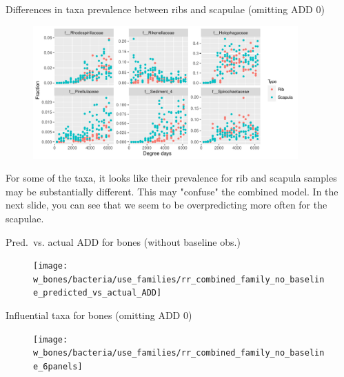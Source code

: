 \documentclass{beamer}
\begin{document}
\begin{frame}{Differences in taxa prevalence between ribs and scapulae (omitting ADD 0)}

  \begin{center}
    \begin{figure}
      \includegraphics[height=2.0in]
        {w_bones/bacteria/use_families/both_ribs_scapulae/no_baseline/infl_combined_bone_no_baseline_family_scatter}
    \end{figure}
  \end{center}

  \footnotesize{
    \noindent For some of the taxa, it looks like their prevalence
    for rib and scapula samples may be substantially different.  This may
    "confuse" the combined model.  In the next slide, you can see that we seem
    to be overpredicting more often for the scapulae.
    }

\end{frame}



\begin{frame}{Pred.\ vs. actual ADD for bones (without baseline obs.)}

  \begin{center}
    \begin{figure}
      \texttt{[image: w\_bones/bacteria/use\_families/rr\_combined\_family\_no\_baseline\_predicted\_vs\_actual\_ADD]}
    \end{figure}
  \end{center}

\end{frame}



\begin{frame}{Influential taxa for bones (omitting ADD 0)}

  \begin{center}
    \begin{figure}
      \texttt{[image: w\_bones/bacteria/use\_families/rr\_combined\_family\_no\_baseline\_6panels]}
    \end{figure}
  \end{center}

\end{frame}
\end{document}
